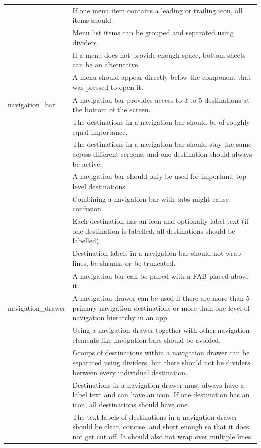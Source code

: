 \documentclass[11pt,titlepage,oneside,openany]{book}
\begin{document}
\begin{longtable}{|p{}|p{}|}
	~ & If one menu item contains a leading or trailing icon, all items should. \\ 
	~ & Menu list items can be grouped and separated using dividers. \\ 
	~ & If a menu does not provide enough space, bottom sheets can be an alternative. \\ 
	~ & A menu should appear directly below the component that was pressed to open it. \\ \hline
	navigation\_bar & A navigation bar provides access to 3 to 5 destinations at the bottom of the screen. \\ 
	~ & The destinations in a navigation bar should be of roughly equal importance. \\ 
	~ & The destinations in a navigation bar should stay the same across different screens, and one destination should always be active. \\ 
	~ & A navigation bar should only be used for important, top-level destinations. \\ 
	~ & Combining a navigation bar with tabs might cause confusion. \\ 
	~ & Each destination has an icon and optionally label text (if one destination is labelled, all destinations should be labelled). \\ 
	~ & Destination labels in a navigation bar should not wrap lines, be shrunk, or be truncated. \\ 
	~ & A navigation bar can be paired with a FAB placed above it. \\ \hline
	navigation\_drawer & A navigation drawer can be used if there are more than 5 primary navigation destinations or more than one level of navigation hierarchy in an app. \\ 
	~ & Using a navigation drawer together with other navigation elements like navigation bars should be avoided. \\ 
	~ & Groups of destinations within a navigation drawer can be separated using dividers, but there should not be dividers between every individual destination. \\ 
	~ & Destinations in a navigation drawer must always have a label text and can have an icon. If one destination has an icon, all destinations should have one. \\ 
	~ & The text labels of destinations in a navigation drawer should be clear, concise, and short enough so that it does not get cut off. It should also not wrap over multiple lines. \\ 

\end{longtable}
\end{document}
